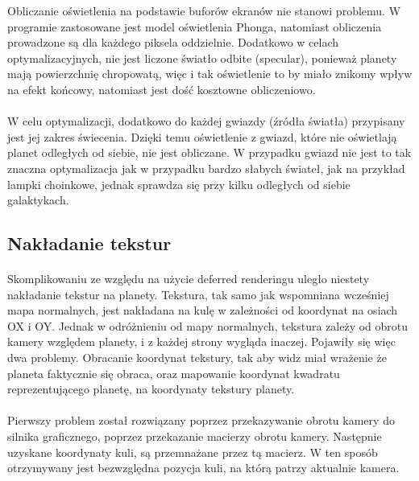 Obliczanie oświetlenia na podstawie buforów ekranów nie stanowi problemu. W programie zastosowane jest model oświetlenia Phonga, natomiast obliczenia prowadzone są dla każdego piksela oddzielnie. Dodatkowo w celach optymalizacyjnych, nie jest liczone światło odbite (specular), ponieważ planety mają powierzchnię chropowatą, więc i tak oświetlenie to by miało znikomy wpływ na efekt końcowy, natomiast jest dość kosztowne obliczeniowo.

\paragraph{}

W celu optymalizacji, dodatkowo do każdej gwiazdy (źródła światła) przypisany jest jej zakres świecenia. Dzięki temu oświetlenie z gwiazd, które nie oświetlają planet odległych od siebie, nie jest obliczane. W przypadku gwiazd nie jest to tak znaczna optymalizacja jak w przypadku bardzo słabych świateł, jak na przykład lampki choinkowe, jednak sprawdza się przy kilku odległych od siebie galaktykach.

\subsection{Nakładanie tekstur}\label{sub:nakladanie tekstur}
\paragraph{}

Skomplikowaniu ze względu na użycie deferred renderingu uległo niestety nakładanie tekstur na planety. Tekstura, tak samo jak wspomniana wcześniej mapa normalnych, jest nakładana na kulę w zależności od koordynat na osiach OX i OY. Jednak w odróżnieniu od mapy normalnych, tekstura zależy od obrotu kamery względem planety, i z każdej strony wygląda inaczej. Pojawiły się więc dwa problemy. Obracanie koordynat tekstury, tak aby widz miał wrażenie że planeta faktycznie się obraca, oraz mapowanie koordynat kwadratu reprezentującego planetę, na koordynaty tekstury planety.

\paragraph{}

Pierwszy problem został rozwiązany poprzez przekazywanie obrotu kamery do silnika graficznego, poprzez przekazanie macierzy obrotu kamery. Następnie uzyskane koordynaty kuli, są przemnażane przez tą macierz. W ten sposób otrzymywany jest bezwzględna pozycja kuli, na którą patrzy aktualnie kamera.

